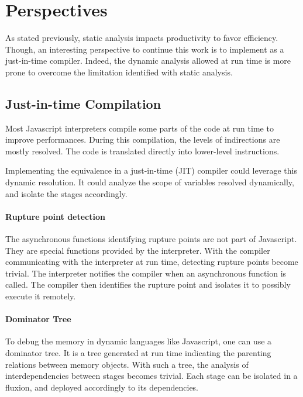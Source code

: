 \section{Perspectives} \label{chapter6:perspective}

As stated previously, static analysis impacts productivity to favor efficiency.
Though, an interesting perspective to continue this work is to implement as a just-in-time compiler.
Indeed, the dynamic analysis allowed at run time is more prone to overcome the limitation identified with static analysis.

\subsection{Just-in-time Compilation}

Most Javascript interpreters compile some parts of the code at run time to improve performances.
During this compilation, the levels of indirections are mostly resolved.
The code is translated directly into lower-level instructions.

Implementing the equivalence in a just-in-time (JIT) compiler could leverage this dynamic resolution.
It could analyze the scope of variables resolved dynamically, and isolate the stages accordingly.

\paragraph{Rupture point detection}

The asynchronous functions identifying rupture points are not part of Javascript.
They are special functions provided by the interpreter.
With the compiler communicating with the interpreter at run time, detecting rupture points become trivial.
The interpreter notifies the compiler when an asynchronous function is called.
The compiler then identifies the rupture point and isolates it to possibly execute it remotely.

\paragraph{Dominator Tree}

To debug the memory in dynamic languages like Javascript, one can use a dominator tree.
It is a tree generated at run time indicating the parenting relations between memory objects.
With such a tree, the analysis of interdependencies between stages becomes trivial.
Each stage can be isolated in a fluxion, and deployed accordingly to its dependencies.

